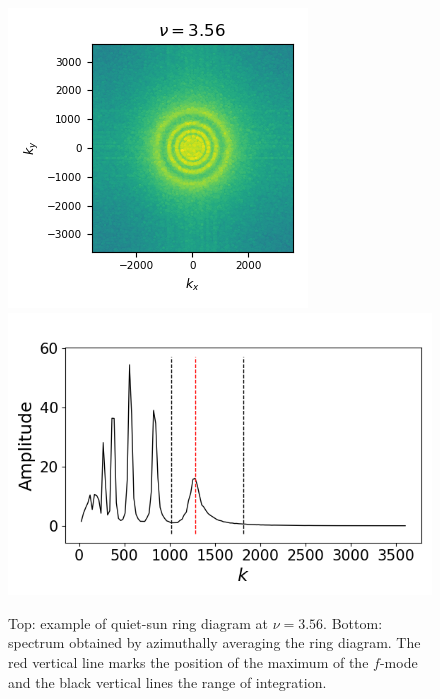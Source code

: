 \documentclass{aa}
\begin{document}
\begin{figure}\centering
	\includegraphics[width=1.0\linewidth,trim={0cm 0.4cm 0cm 0.3cm},clip=TRUE]{ring_diagram}\\
	\includegraphics[width=1.0\linewidth,trim={0cm 0cm 0cm 1cm},clip=TRUE]{az_avg_spec}
	\caption{Top: example of quiet-sun ring diagram at $\nu=3.56$. Bottom: spectrum obtained by azimuthally averaging the ring diagram. The red vertical line marks the position of the maximum of the $f$-mode and the black vertical lines the range of integration.}
	\label{ring_diagram}
\end{figure}
\end{document}
